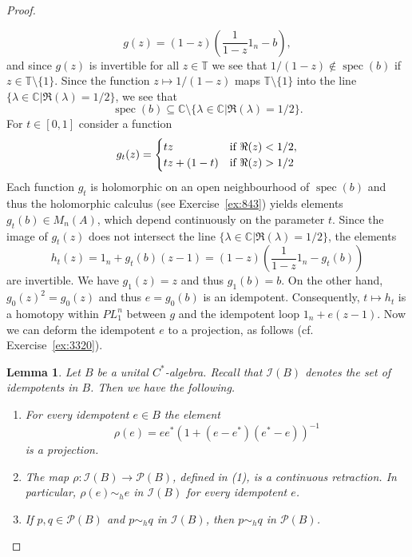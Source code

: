 \documentclass{book}
\newtheorem{lemma}[definition]{Lemma}
\def\cstar{\(C^*\)-algebra}
\begin{document}
\begin{proof}
\begin{enumerate}[label={}]
\begin{enumerate}[label={}]
      \[
        g(z)=(1-z)\left(\frac{1}{1-z}1_n-b\right),
      \]
      and since \(g(z)\) is invertible for all \(z\in\mathbb{T}\) we see that \(1/(1-z)\notin \operatorname{spec}(b)\) if \(z\in\mathbb{T}\setminus \{1\}\).
      Since the function \(z\mapsto1/(1-z)\) maps \(\mathbb{T}\setminus \{1\}\) into the line \(\{\lambda\in\mathbb{C}| \Re(\lambda)=1/2 \}\), we see that
      \[
        \operatorname{spec}(b)\subseteq\mathbb{C}\setminus \{\lambda\in\mathbb{C}| \Re(\lambda)=1/2\}.
      \]
      For \(t\in[0,1]\) consider a function
      \[
        g_t(z)=
        \begin{cases}
          tz&\textnormal{if }\Re(z)<1/2,\\
          tz+(1-t)&\textnormal{if }\Re(z)>1/2
        \end{cases}
      \]
      Each function \(g_t\) is holomorphic on an open neighbourhood of \(\operatorname{spec}(b)\)
      and thus the holomorphic calculus (see Exercise~\ref{ex:843}) yields elements \(g_t(b)\in M_n(A)\),
      which depend continuously on the parameter \(t\). Since the image of \(g_t(z)\) does not intersect the line
      \(\{\lambda\in\mathbb{C}| \Re(\lambda)=1/2\}\), the elements 
      \[
        h_t(z)=1_n+g_t(b)(z-1)=(1-z)\left(\frac{1}{1-z}1_n-g_t(b)\right)
      \]
      are invertible. We have \(g_1(z)=z\) and thus \(g_1(b)=b\). On the other hand, \({g_0(z)}^{2}=g_0(z)\) and thus \(e=g_0(b)\) is an idempotent.
      Consequently, \(t\mapsto h_t\) is a homotopy within \(PL_1^n\) between \(g\) and the idempotent 
      loop \(1_n+e(z-1)\). Now we can deform the idempotent \(e\) to a projection, as follows (cf. Exercise~\ref{ex:3320}).
      \begin{lemma}\label{lemma:822}
        Let \(B\) be a unital \cstar. Recall that \(\mathcal{I}(B)\) denotes the set of idempotents in \(B\).
        Then we have the following.
        \begin{enumerate}
          \item For every idempotent \(e\in B\) the element 
          \[
            \rho(e)=e e^*{(1+(e-e^*)(e^*-e))}^{-1}
          \]
          is a projection.
          \item The map \(\rho:\mathcal{I}(B)\rightarrow\mathcal{P}(B)\), defined in (1), is a continuous retraction. 
          In particular, \(\rho(e)\sim_h e\) in \(\mathcal{I}(B)\) for every idempotent \(e\).
          \item If \(p,q\in\mathcal{P}(B)\) and \(p\sim_h q\) in \(\mathcal{I}(B)\), then \(p\sim_h q\) in \(\mathcal{P}(B)\).
        \end{enumerate}

\end{lemma}
\end{enumerate}
\end{enumerate}
\end{proof}
\end{document}

